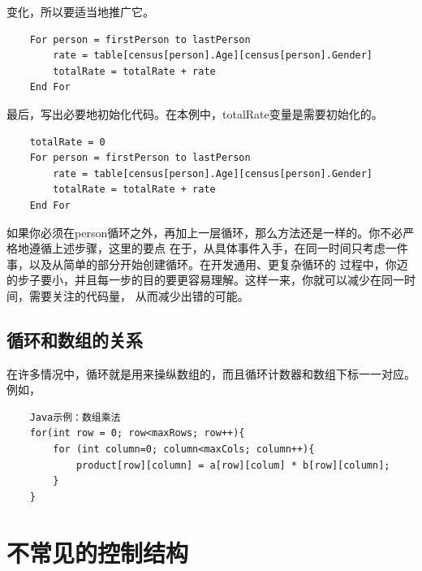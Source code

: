 \documentclass{article}
\begin{document}
变化，所以要适当地推广它。
\begin{lstlisting}
    For person = firstPerson to lastPerson
        rate = table[census[person].Age][census[person].Gender]
        totalRate = totalRate + rate
    End For
\end{lstlisting}
最后，写出必要地初始化代码。在本例中，totalRate变量是需要初始化的。
\begin{lstlisting}
    totalRate = 0
    For person = firstPerson to lastPerson
        rate = table[census[person].Age][census[person].Gender]
        totalRate = totalRate + rate
    End For
\end{lstlisting}
如果你必须在person循环之外，再加上一层循环，那么方法还是一样的。你不必严格地遵循上述步骤，这里的要点
在于，从具体事件入手，在同一时间只考虑一件事，以及从简单的部分开始创建循环。在开发通用、更复杂循环的
过程中，你迈的步子要小，并且每一步的目的要更容易理解。这样一来，你就可以减少在同一时间，需要关注的代码量，
从而减少出错的可能。

\subsection{循环和数组的关系}
在许多情况中，循环就是用来操纵数组的，而且循环计数器和数组下标一一对应。例如，
\begin{lstlisting}
    Java示例：数组乘法
    for(int row = 0; row<maxRows; row++){
        for (int column=0; column<maxCols; column++){
            product[row][column] = a[row][colum] * b[row][column];
        }
    }
\end{lstlisting}

\section{不常见的控制结构}
\end{document}
